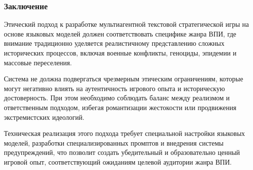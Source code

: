 \subsubsection{Заключение}

Этический подход к разработке мультиагентной текстовой стратегической игры на основе языковых моделей должен соответствовать специфике жанра ВПИ, где внимание традиционно уделяется реалистичному представлению сложных исторических процессов, включая военные конфликты, геноциды, эпидемии и массовые переселения.

Система не должна подвергаться чрезмерным этическим ограничениям, которые могут негативно влиять на аутентичность игрового опыта и историческую достоверность. При этом необходимо соблюдать баланс между реализмом и ответственным подходом, избегая романтизации жестокости или продвижения экстремистских идеологий.

Техническая реализация этого подхода требует специальной настройки языковых моделей, разработки специализированных промптов и внедрения системы предупреждений, что позволит создать убедительный и образовательно ценный игровой опыт, соответствующий ожиданиям целевой аудитории жанра ВПИ.